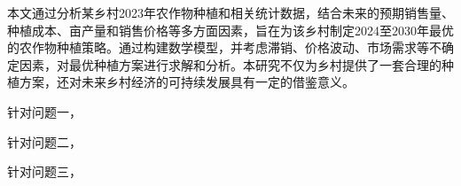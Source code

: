 

{\song\xiaosihao
\setlength{\parindent}{2em}
本文通过分析某乡村2023年农作物种植和相关统计数据，结合未来的预期销售量、种植成本、亩产量和销售价格等多方面因素，旨在为该乡村制定2024至2030年最优的农作物种植策略。通过构建数学模型，并考虑滞销、价格波动、市场需求等不确定因素，对最优种植方案进行求解和分析。本研究不仅为乡村提供了一套合理的种植方案，还对未来乡村经济的可持续发展具有一定的借鉴意义。

\setlength{\parindent}{2em} 针对问题一，

\setlength{\parindent}{2em} 针对问题二，

\setlength{\parindent}{2em} 针对问题三，
}





